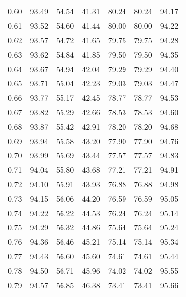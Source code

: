 \begin{tabular}{|c|c|c|c|c|c|c|}
      0.60 &     93.49 &     54.54 &      41.31 &   80.24 &      80.24 &         94.17 \\
      0.61 &     93.52 &     54.60 &      41.44 &   80.00 &      80.00 &         94.22 \\
      0.62 &     93.57 &     54.72 &      41.65 &   79.75 &      79.75 &         94.28 \\
      0.63 &     93.62 &     54.84 &      41.85 &   79.50 &      79.50 &         94.35 \\
      0.64 &     93.67 &     54.94 &      42.04 &   79.29 &      79.29 &         94.40 \\
      0.65 &     93.71 &     55.04 &      42.23 &   79.03 &      79.03 &         94.47 \\
      0.66 &     93.77 &     55.17 &      42.45 &   78.77 &      78.77 &         94.53 \\
      0.67 &     93.82 &     55.29 &      42.66 &   78.53 &      78.53 &         94.60 \\
      0.68 &     93.87 &     55.42 &      42.91 &   78.20 &      78.20 &         94.68 \\
      0.69 &     93.94 &     55.58 &      43.20 &   77.90 &      77.90 &         94.76 \\
      0.70 &     93.99 &     55.69 &      43.44 &   77.57 &      77.57 &         94.83 \\
      0.71 &     94.04 &     55.80 &      43.68 &   77.21 &      77.21 &         94.91 \\
      0.72 &     94.10 &     55.91 &      43.93 &   76.88 &      76.88 &         94.98 \\
      0.73 &     94.15 &     56.06 &      44.20 &   76.59 &      76.59 &         95.05 \\
      0.74 &     94.22 &     56.22 &      44.53 &   76.24 &      76.24 &         95.14 \\
      0.75 &     94.29 &     56.32 &      44.86 &   75.64 &      75.64 &         95.24 \\
      0.76 &     94.36 &     56.46 &      45.21 &   75.14 &      75.14 &         95.34 \\
      0.77 &     94.43 &     56.60 &      45.60 &   74.61 &      74.61 &         95.44 \\
      0.78 &     94.50 &     56.71 &      45.96 &   74.02 &      74.02 &         95.55 \\
      0.79 &     94.57 &     56.85 &      46.38 &   73.41 &      73.41 &         95.66 \\

\end{tabular}
